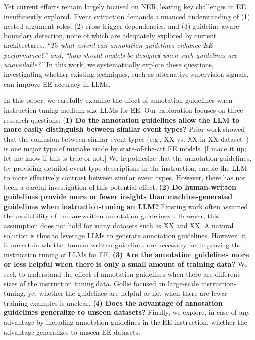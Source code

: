 Yet current efforts remain largely focused on NER, leaving key challenges in EE insufficiently explored.  Event extraction demands a nuanced understanding of (1) nested argument roles, (2) cross-trigger dependencies, and (3) guideline-aware boundary detection, none of which are adequately explored by current architectures. \textit{``To what extent can annotation guidelines enhance EE performance?'' and, ``how should models be designed when such guidelines are unavailable?''} In this work, we systematically explore these questions, investigating whether existing techniques, such as alternative supervision signals, can improve EE accuracy in LLMs.


In this paper, we carefully examine the effect of annotation guidelines when instruction-tuning medium-size LLMs for EE. Our exploration focuses on three research questions:
\textbf{(1) Do the annotation guidelines allow the LLM to more easily distinguish between similar event types?} Prior work showed that the confusion between similar event types (e.g., XX vs. XX in XX dataset~\cite{?}) is one major type of mistake made by state-of-the-art EE models. [I made it up; let me know if this is true or not.] We hypothesize that the annotation guidelines, by providing detailed event type descriptions in the instruction, enable the LLM to more effectively contrast between similar event types. However, there has not been a careful investigation of this potential effect.
\textbf{(2) Do human-written guidelines provide more or fewer insights than machine-generated guidelines when instruction-tuning an LLM?} Existing work often assumed the availability of human-written annotation guidelines~\cite{?}. However, this assumption does not hold for many datasets such as XX and XX. A natural solution is thus to leverage LLMs to generate annotation guidelines. However, it is uncertain whether human-written guidelines are necessary for improving the instruction tuning of LLMs for EE.
\textbf{(3) Are the annotation guidelines more or less helpful when there is only a small amount of training data?} We seek to understand the effect of annotation guidelines when there are different sizes of the instruction tuning data. Gollie focused on large-scale instruction-tuning, yet whether the guidelines are helpful or not when there are fewer training examples is unclear.
\textbf{(4) Does the advantage of annotation guidelines generalize to unseen datasets?} Finally, we explore, in case of any advantage by including annotation guidelines in the EE instruction, whether the advantage generalizes to unseen EE datasets. 

